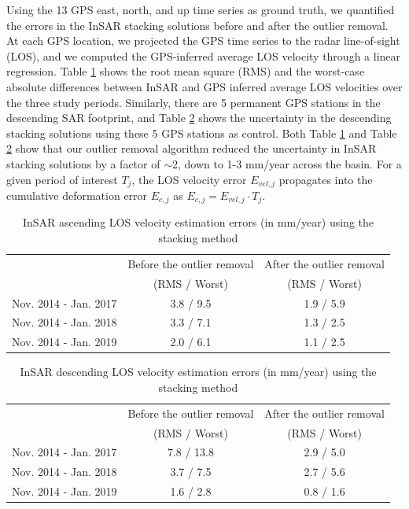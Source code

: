 Using the 13 GPS east, north, and up time series as ground truth, we quantified the errors in the InSAR stacking solutions before and after the outlier removal. 
At each GPS location, we projected the GPS time series to the radar line-of-sight (LOS), and we computed the GPS-inferred average LOS velocity through a linear regression. Table \ref{tab:gps-error-78} shows the root mean square (RMS) and the worst-case absolute differences between InSAR and GPS inferred average LOS velocities over the three study periods. Similarly, there are 5 permanent GPS stations in the descending SAR footprint, and Table \ref{tab:gps-error-85} shows the uncertainty in the descending stacking solutions using these 5 GPS stations as control. Both Table \ref{tab:gps-error-78} and Table \ref{tab:gps-error-85} show that our outlier removal algorithm reduced the uncertainty in InSAR stacking solutions by a factor of $\sim$2, down to 1-3 mm/year across the basin. For a given period of interest $T_j$, the LOS velocity error $ E_{vel,j} $ propagates into the cumulative deformation error $ E_{c, j} $ as $ E_{c,j} = E_{vel,j} \cdot T_j $. 


\begin{table}
	\caption{InSAR ascending LOS velocity estimation errors (in mm/year) using the stacking method}
	\centering
	\begin{tabular}{|c|c|c|}
		\hline 
		& Before the outlier removal & After the outlier removal \\
		& (RMS / Worst) & (RMS / Worst) \\
		\hline
		Nov. 2014 - Jan. 2017 & 3.8 / 9.5         & 1.9 / 5.9       \\\hline
		Nov. 2014 - Jan. 2018 & 3.3 / 7.1         & 1.3 / 2.5       \\\hline
		Nov. 2014 - Jan. 2019 & 2.0 / 6.1         & 1.1 / 2.5       \\\hline                
	\end{tabular}
	\label{tab:gps-error-78}
\end{table}

\begin{table}
	\caption{InSAR descending LOS velocity estimation errors (in mm/year) using the stacking method}
	\begin{tabular}{|c|c|c|}
		\hline 
		& Before the outlier removal & After the outlier removal \\
		& (RMS / Worst) & (RMS / Worst) \\
		\hline 
		Nov. 2014 - Jan. 2017 & 7.8 / 13.8                            & 2.9 / 5.0                          \\\hline
		Nov. 2014 - Jan. 2018 & 3.7 / 7.5                             & 2.7 / 5.6                          \\\hline
		Nov. 2014 - Jan. 2019 & 1.6 / 2.8                             & 0.8 / 1.6  \\\hline     
	\end{tabular}
	\label{tab:gps-error-85}
\end{table}




